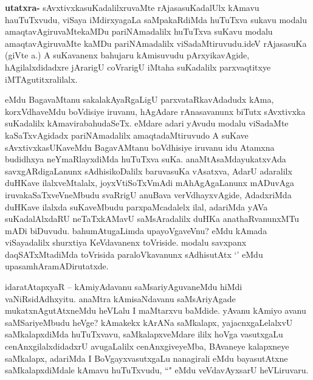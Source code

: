 \begin{artha}
\textbf{utatxra-} sAvxtivxkasuKadalilxruvaMte rAjasasuKadalUlx kAmavu hauTuTxvudu, viSaya iMdirxyagaLa saMpakaRdiMda huTuTxva sukavu modalu amaqtavAgiruvaMtekaMDu pariNAmadalilx huTuTxva suKavu modalu amaqtavAgiruvaMte kaMDu pariNAmadalilx viSadaMtiruvudu.ideV rAjasasuKa (giVte a.) A suKavanenx bahujaru kAmisuvudu pArxyikavAgide, hAgilalxdidadxre jArarigU coVrarigU iMtaha suKadalilx parxvaqtitxye iMTAgutitxralilalx. 
\end{artha}

\begin{artha}
eMdu BagavaMtanu sakalakAyaRgaLigU parxvataRkavAdadudx kAma, korxVdhaveMdu boVdisiye iruvanu, hAgAdare rAnasavanunx biTutx sAvxtivxka suKadalilx kAmavirabahudaSeTx. eMdare adari yAvudu modalu viSadaMte kaSaTxvAgidadx pariNAmadalilx amaqtadaMtiruvudo A suKave sAvxtivxkasUKaveMdu BagavAMtanu boVdhisiye iruvanu idu Atamxna budidhxya neYmaRlayxdiMda huTuTxva suKa. anaMtAsaMdayukatxvAda savxgARdigaLanunx sAdhisikoDalilx baruvasuKa vAsatxva, AdarU adaralilx duHKave ilalxveMtalalx, joyxVtiSoTxVmAdi mAhAgAgaLanunx mADuvAga iruvakaSaTxveVneMbudu svaRrigU anuBava verVdhayxvAgide, AdadxriMda duHKave ilalxda suKaveMbudu parxpaMcadalelx ilal, adariMda yAVa suKadalAlxdaRU neTaTxkAMavU saMsAradalilx duHKa anathaRvanunxMTu mADi biDuvudu. bahumAtugaLimda upayoVgaveVnu? eMdu kAmada viSayadalilx shurxtiya KeVdavanenx toVriside. modalu savxpanx daqSATxMtadiMda toVrisida paraloVkavanunx sAdhisutAtx `\stext' eMdu upasamhAramADirutatxde.
\end{artha}

\begin{artha}
idaratAtapxyaR -- kAmiyAdavanu saMsariyAguvaneMdu hiMdi vaNiRsidAdhxyitu. anaMtra kAmisaNdavanu saMsAriyAgade mukatxnAgutAtxneMdu heVLalu I maMtarxvu baMdide.
yAvanu kAmiyo avanu saMSariyeMbudu heVge? kAmakekx kArANa saMkalapx, yajacnxgaLelalxvU saMkalapxdiMda huTuTxvavu, saMkalapxveMdare ililx hoVga vasutxgaLu cenAnxgilalxdidadxrU avugaLalilx cenAnxgiveyeMba, BAvaneye kalapxneye saMkalapx, adariMda I BoVgayxvasutxgaLu nanagirali eMdu bayasutAtxne saMkalapxdiMdale kAmavu huTuTxvudu, ``\stext" eMdu veVdavAyxsarU heVLiruvaru.
\end{artha}



